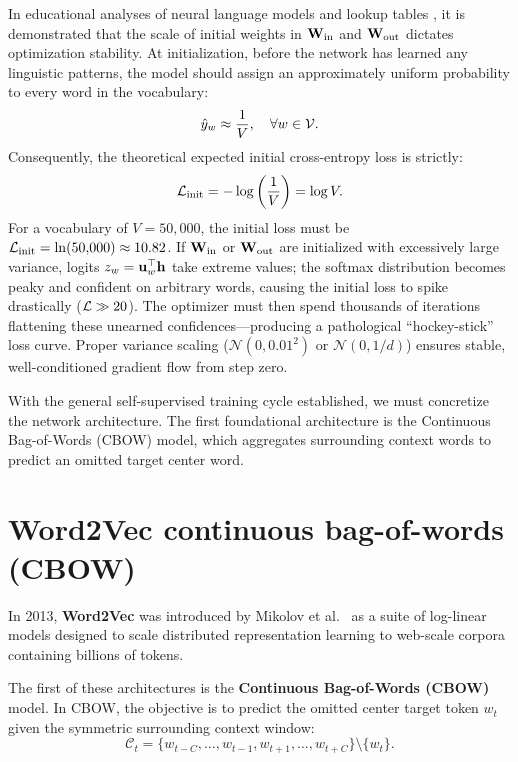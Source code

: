 \documentclass[../../main.tex]{subfiles}
\begin{document}
In educational analyses of neural language models and lookup tables \cite{karpathy2022makemore}, it is demonstrated that the scale of initial weights in $\mathbf{W}_{\text{in}}$ and $\mathbf{W}_{\text{out}}$ dictates optimization stability. At initialization, before the network has learned any linguistic patterns, the model should assign an approximately uniform probability to every word in the vocabulary:
\begin{equation}
\label{eq:uniform_prior}
\hat{y}_w \approx \frac{1}{V}, \quad \forall w \in \mathcal{V}.
\end{equation}
Consequently, the theoretical expected initial cross-entropy loss is strictly:
\begin{equation}
\label{eq:expected_initial_loss}
\mathcal{L}_{\text{init}} = -\log \left( \frac{1}{V} \right) = \log V.
\end{equation}
For a vocabulary of $V = 50{,}000$, the initial loss must be $\mathcal{L}_{\text{init}} = \ln(50{,}000) \approx 10.82$. If $\mathbf{W}_{\text{in}}$ or $\mathbf{W}_{\text{out}}$ are initialized with excessively large variance, logits $z_w = \mathbf{u}_w^\top \mathbf{h}$ take extreme values; the softmax distribution becomes peaky and confident on arbitrary words, causing the initial loss to spike drastically ($\mathcal{L} \gg 20$). The optimizer must then spend thousands of iterations flattening these unearned confidences---producing a pathological ``hockey-stick'' loss curve. Proper variance scaling ($\mathcal{N}(0, 0.01^2)$ or $\mathcal{N}(0, 1/d)$) ensures stable, well-conditioned gradient flow from step zero.

With the general self-supervised training cycle established, we must concretize the network architecture. The first foundational architecture is the Continuous Bag-of-Words (CBOW) model, which aggregates surrounding context words to predict an omitted target center word.

\clearpage
\section{Word2Vec continuous bag-of-words (CBOW)}
\label{sec:cbow_architecture}

In 2013, \textbf{Word2Vec} was introduced by Mikolov et al.~\cite{mikolov2013efficient,mikolov2013distributed} as a suite of log-linear models designed to scale distributed representation learning to web-scale corpora containing billions of tokens.

The first of these architectures is the \textbf{Continuous Bag-of-Words (CBOW)} model. In CBOW, the objective is to predict the omitted center target token $w_t$ given the symmetric surrounding context window:
\begin{equation}
\label{eq:cbow_context_def}
\mathcal{C}_t = \{w_{t-C}, \dots, w_{t-1}, w_{t+1}, \dots, w_{t+C}\} \setminus \{w_t\}.
\end{equation}
\end{document}
